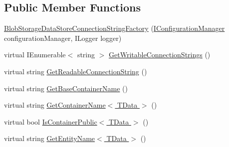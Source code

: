 \subsection*{Public Member Functions}
\begin{DoxyCompactItemize}
\item 
\hyperlink{classCqrs_1_1Azure_1_1BlobStorage_1_1DataStores_1_1BlobStorageDataStoreConnectionStringFactory_ade6a85d6f80fd8cd53c2853ee103de9d}{Blob\+Storage\+Data\+Store\+Connection\+String\+Factory} (\hyperlink{interfaceCqrs_1_1Configuration_1_1IConfigurationManager}{I\+Configuration\+Manager} configuration\+Manager, I\+Logger logger)
\item 
virtual I\+Enumerable$<$ string $>$ \hyperlink{classCqrs_1_1Azure_1_1BlobStorage_1_1DataStores_1_1BlobStorageDataStoreConnectionStringFactory_a71b549351646fd4261b3f52f264759f4}{Get\+Writable\+Connection\+Strings} ()
\item 
virtual string \hyperlink{classCqrs_1_1Azure_1_1BlobStorage_1_1DataStores_1_1BlobStorageDataStoreConnectionStringFactory_a1b5b69109d07e5612df981012d812e78}{Get\+Readable\+Connection\+String} ()
\item 
virtual string \hyperlink{classCqrs_1_1Azure_1_1BlobStorage_1_1DataStores_1_1BlobStorageDataStoreConnectionStringFactory_af9d95c58f5f275d9c9c1575b3d147bdb}{Get\+Base\+Container\+Name} ()
\item 
virtual string \hyperlink{classCqrs_1_1Azure_1_1BlobStorage_1_1DataStores_1_1BlobStorageDataStoreConnectionStringFactory_a20374b5e2e77a593da164d3eb42b2a0a}{Get\+Container\+Name$<$ T\+Data $>$} ()
\item 
virtual bool \hyperlink{classCqrs_1_1Azure_1_1BlobStorage_1_1DataStores_1_1BlobStorageDataStoreConnectionStringFactory_a96e368a2b00f9614eff6ca4bcdeb3a24}{Is\+Container\+Public$<$ T\+Data $>$} ()
\item 
virtual string \hyperlink{classCqrs_1_1Azure_1_1BlobStorage_1_1DataStores_1_1BlobStorageDataStoreConnectionStringFactory_a0ece7f48e0305b8397b95308dfdf2532}{Get\+Entity\+Name$<$ T\+Data $>$} ()
\end{DoxyCompactItemize}
